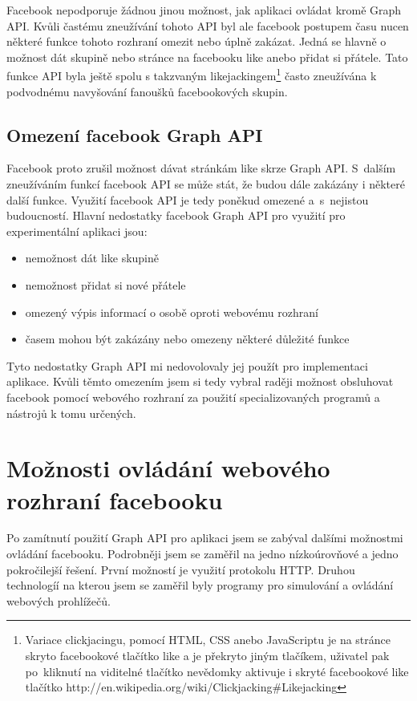 \documentclass[thesis=M,czech]{FITthesis}[2013/05/10]
\begin{document}
Facebook nepodporuje žádnou jinou možnost, jak aplikaci ovládat kromě Graph API. Kvůli častému zneužívání tohoto API byl ale facebook postupem času nucen některé funkce tohoto rozhraní omezit nebo úplně zakázat. Jedná se hlavně o možnost dát skupině nebo stránce na facebooku like anebo přidat si přátele. Tato funkce API byla ještě spolu s takzvaným likejackingem\footnote{Variace clickjacingu, pomocí HTML, CSS anebo JavaScriptu je na stránce skryto facebookové tlačítko like a je překryto jiným tlačíkem, uživatel pak po~kliknutí na viditelné tlačítko nevědomky aktivuje i skryté facebookové like tlačítko http://en.wikipedia.org/wiki/Clickjacking\#Likejacking} často zneužívána k podvodnému navyšování fanoušků facebookových skupin. 

\subsection{Omezení facebook Graph API}

Facebook proto zrušil možnost dávat stránkám like skrze Graph API. S~dalším zneužíváním funkcí facebook API se může stát, že budou dále zakázány i některé další funkce. Využití facebook API je tedy poněkud omezené a~s~nejistou budoucností. Hlavní nedostatky facebook Graph API pro využití pro experimentální aplikaci jsou:

\begin{itemize}
  \item nemožnost dát like skupině
  \item nemožnost přidat si nové přátele
  \item omezený výpis informací o osobě oproti webovému rozhraní
  \item časem mohou být zakázány nebo omezeny některé důležité funkce
\end{itemize}

Tyto nedostatky Graph API mi nedovolovaly jej použít pro implementaci  aplikace. Kvůli těmto omezením jsem si tedy vybral raději možnost obsluhovat facebook pomocí webového rozhraní za použití specializovaných programů a nástrojů k tomu určených.

\section{Možnosti ovládání webového rozhraní facebooku}

Po zamítnutí použití Graph API pro aplikaci jsem se zabýval dalšími možnostmi ovládání facebooku. Podrobněji jsem se zaměřil na jedno nízkoúrovňové a jedno pokročilejší řešení. První možností je využití protokolu HTTP. Druhou technologíí na kterou jsem se zaměřil byly programy pro simulování a ovládání webových prohlížečů.
\end{document}
